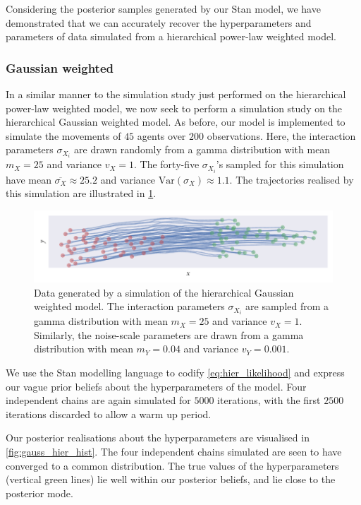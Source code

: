Considering the posterior samples generated by our Stan model, we have
demonstrated that we can accurately recover the hyperparameters and parameters
of data simulated from a hierarchical power-law weighted model.

\subsubsection{Gaussian weighted}

In a similar manner to the simulation study just performed on the hierarchical
power-law weighted model, we now seek to perform a simulation study on the
hierarchical Gaussian weighted model. As before, our model is implemented to
simulate the movements of $45$ agents over $200$ observations. Here, the
interaction parameters $\sigma_{X_i}$ are drawn randomly from a gamma
distribution with mean $m_X=25$ and variance $v_X=1$. The forty-five
$\sigma_{X_i}$'s sampled for this simulation have mean
$\overline{\sigma_X}\approx25.2$ and variance $\text{Var}(\sigma_X)\approx1.1$.
The trajectories realised by this simulation are illustrated in
\cref{fig:gauss_hier_sim}.

\begin{figure}[tbp]
  \includegraphics{gauss_hier_sim.pdf}
  \caption{Data generated by a simulation of the hierarchical Gaussian weighted
    model. The interaction parameters $\sigma_{X_i}$ are sampled from a gamma
    distribution with mean $m_X=25$ and variance $v_X=1$. Similarly, the
    noise-scale parameters are drawn from a gamma distribution with mean
    $m_Y=0.04$ and variance $v_Y=0.001$.} 
  \label{fig:gauss_hier_sim}
\end{figure}

We use the Stan modelling language to codify \cref{eq:hier_likelihood} and
express our vague prior beliefs about the hyperparameters of the model. Four
independent chains are again simulated for $5000$ iterations, with the first
$2500$ iterations discarded to allow a warm up period.

Our posterior realisations about the hyperparameters are visualised in
\cref{fig:gauss_hier_hist}. The four independent chains simulated are seen to
have converged to a common distribution. The true values of the hyperparameters
(vertical green lines) lie well within our posterior beliefs, and lie close to
the posterior mode.

